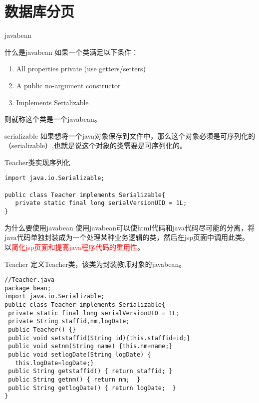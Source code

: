 \documentclass{beamer}
\begin{document}
\section{数据库分页}
\begin{frame}
\Huge{\centerline{javabean}}
\end{frame}
\begin{frame}{什么是javabean}
如果一个类满足以下条件：
\begin{enumerate}
\item
All properties private (use getters/setters)
\item
A public no-argument constructor
\item
Implements Serializable
\end{enumerate}
则就称这个类是一个javabean。
\end{frame}
\begin{frame}[fragile]{serializable}
如果想将一个java对象保存到文件中，那么这个对象必须是可序列化的（serializable）,也就是说这个对象的类需要是可序列化的。
\begin{block}{Teacher类实现序列化}
\begin{lstlisting}
import java.io.Serializable;

public class Teacher implements Serializable{
   private static final long serialVersionUID = 1L;
}
\end{lstlisting}
\end{block}
\end{frame}
\begin{frame}{为什么要使用javabean}
使用javabean可以使html代码和java代码尽可能的分离，将java代码单独封装成为一个处理某种业务逻辑的类，然后在jsp页面中调用此类。以\textcolor{red}{简化jsp页面和提高java程序代码的重用性}。
\end{frame}
\begin{frame}[fragile]{Teacher}
定义Teacher类，该类为封装教师对象的javabean。
\begin{lstlisting}
//Teacher.java
package bean;
import java.io.Serializable;
public class Teacher implements Serializable{
 private static final long serialVersionUID = 1L;
 private String staffid,nm,logDate;	
 public Teacher() {}
 public void setstaffid(String id){this.staffid=id;}
 public void setnm(String name) {this.nm=name;}
 public void setlogDate(String logDate) {
   this.logDate=logDate;}
 public String getstaffid() { return staffid; }
 public String getnm() { return nm;  }
 public String getlogDate() { return logDate;  }
}
\end{lstlisting}

\end{frame}
\end{document}
